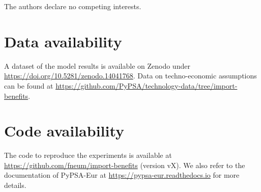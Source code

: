 \documentclass[1p,11pt]{elsarticle}
\renewcommand{\ttdefault}{\sfdefault}
\begin{document}
The authors declare no competing interests.

\section*{Data availability}

A dataset of the model results is available on Zenodo under
\url{https://doi.org/10.5281/zenodo.14041768}. Data on techno-economic
assumptions can be found at
\url{https://github.com/PyPSA/technology-data/tree/import-benefits}.

\section*{Code availability}

The code to reproduce the experiments is available at
\url{https://github.com/fneum/import-benefits} (version vX). We also refer to
the documentation of PyPSA-Eur at \url{https://pypsa-eur.readthedocs.io} for
more details.
 
\renewcommand{\ttdefault}{\sfdefault}
% 


\setcounter{LastMainFigure}{\value{figure}}
\end{document}
